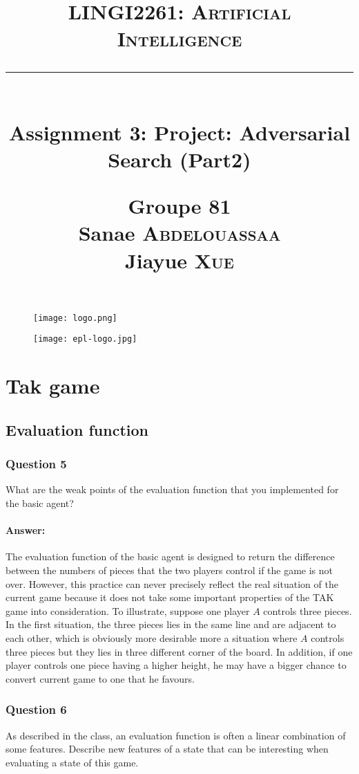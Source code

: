 \documentclass[12pt, a4paper]{report}
\title{
    \vspace{0.5cm} \textcolor{db}{\textsc{LINGI2261: Artificial Intelligence}} \\
    \vspace{0.5 cm} \rule{10 cm}{0.5pt} \\
    \vspace{0.5 cm} \Large{Assignment 3: Project: Adversarial Search (Part2)} \\
    \vspace{3 cm}
    \begin{flushright}
        \large
        \textbf{Groupe 81} \\
        Sanae \textsc{Abdelouassaa} \\
        Jiayue \textsc{Xue} \\     
    \end{flushright}
    \vspace{0.5 cm}
}
\begin{document}
\begin{figure}[t]
    \texttt{[image: logo.png]}
 \end{figure}

\begin{figure}[t]
    \hspace{10 cm} \texttt{[image: epl-logo.jpg]}
\end{figure}

\maketitle

\tableofcontents

\chapter{Tak game}

\section{Evaluation function}
\subsection{Question 5}
What are the weak points of the evaluation function that you implemented for the basic agent?
\subsubsection{Answer:}
The evaluation function of the basic agent is designed to return the difference between the numbers of pieces that the two players control if the game is not over. However, this practice can never precisely reflect the real situation of the current game because it does not take some important properties of the TAK game into consideration. To illustrate, suppose one player $A$ controls three pieces. In the first situation, the three pieces lies in the same line and are adjacent to each other, which is obviously more desirable more a situation where $A$ controls three pieces but they lies in three different corner of the board. In addition, if one player controls one piece having a higher height, he may have a bigger chance to convert current game to one that he favours.

\subsection{Question 6}
As described in the class, an evaluation function is often a linear combination of some features. Describe new features of a state that can be interesting when evaluating a state of this game.
\end{document}
